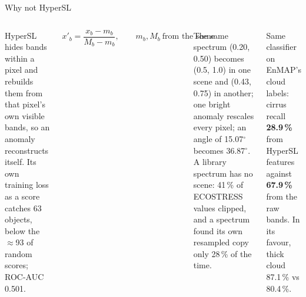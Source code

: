 \documentclass[aspectratio=169,10pt]{beamer}
\begin{document}
\begin{frame}{Why not HyperSL}
\begin{columns}[T,onlytextwidth]
\par\vspace{0.3mm}
{\scriptsize HyperSL hides bands within a pixel and rebuilds them from that pixel's own visible bands, so an anomaly reconstructs itself. Its own training loss as a score catches 63 objects, below the $\approx$93 of random scores; ROC-AUC 0.501.\par}
\vspace{1.5mm}
\par\vspace{-1mm}
{\footnotesize\[x'_b=\frac{x_b-m_b}{M_b-m_b},\qquad m_b, M_b\ \text{from the scene}\]\par}
\vspace{-1mm}
{\scriptsize The same spectrum (0.20, 0.50) becomes (0.5, 1.0) in one scene and (0.43, 0.75) in another; one bright anomaly rescales every pixel; an angle of 15.07$^\circ$ becomes 36.87$^\circ$. A library spectrum has no scene: 41\,\% of ECOSTRESS values clipped, and a spectrum found its own resampled copy only 28\,\% of the time.\par}
\par\vspace{0.3mm}
{\scriptsize Same classifier on EnMAP's cloud labels: cirrus recall \textbf{28.9\,\%} from HyperSL features against \textbf{67.9\,\%} from the raw bands. In its favour, thick cloud 87.1\,\% vs 80.4\,\%.\par}
\vspace{1.5mm}
\par\vspace{0.3mm}
\end{columns}
\end{frame}
\end{document}
